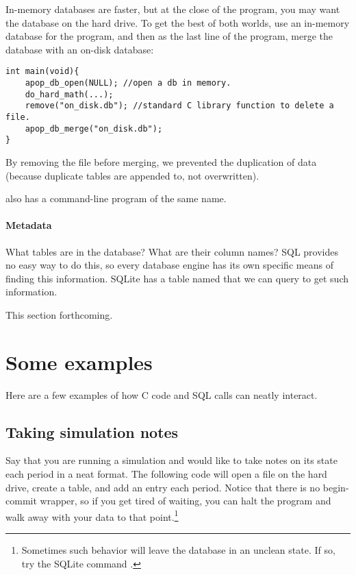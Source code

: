In-memory databases are faster, but at the close of the program, you
may want the database on the hard drive. To get the best of both
worlds, use an in-memory database for the program, and then as the last
line of the program, merge the database with an on-disk database:
\begin{lstlisting}
int main(void){
    apop_db_open(NULL); //open a db in memory.
    do_hard_math(...);
    remove("on_disk.db"); //standard C library function to delete a file.
    apop_db_merge("on_disk.db");
}
\end{lstlisting}
By removing the file before merging, we prevented the duplication of
data (because duplicate tables are appended to, not overwritten).

 also has a command-line program of the
same name.


\paragraph{Metadata} What tables are in the database? What are their
column names? SQL provides no easy way to do this, so every database
engine has its own specific means of finding this information. SQLite
has a table named  that we can query to get
such information.

This section forthcoming.

\section{Some examples} 
Here are a few examples of how C code and SQL calls can neatly interact.

\subsection{Taking simulation notes}\label{createeg}
Say that you are running a simulation and would like to take notes on
its state each period in a neat format. The following code will open a
file on the hard drive, create a table, and add an entry each period.
Notice that there is no begin-commit wrapper, so if you get tired of
waiting, you can halt the program and walk away with
your data to that point.\footnote{Sometimes such behavior will leave the database in
an unclean state. If so, try the SQLite command .}


